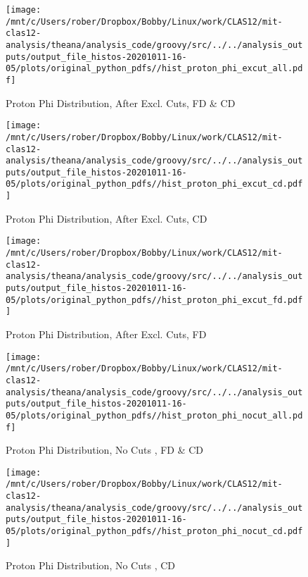 \documentclass{article}
\begin{document}
\begin{landscape}
    \begin{figure}[h]
        \centering

        \texttt{[image: /mnt/c/Users/rober/Dropbox/Bobby/Linux/work/CLAS12/mit-clas12-analysis/theana/analysis\_code/groovy/src/../../analysis\_outputs/output\_file\_histos-20201011-16-05/plots/original\_python\_pdfs//hist\_proton\_phi\_excut\_all.pdf]}
        \captionsetup{textformat=empty,labelformat=blank}
        \caption{Proton Phi Distribution, After Excl. Cuts, FD \& CD}
    \end{figure}
    \clearpage
    
    \begin{figure}[h]
        \centering

        \texttt{[image: /mnt/c/Users/rober/Dropbox/Bobby/Linux/work/CLAS12/mit-clas12-analysis/theana/analysis\_code/groovy/src/../../analysis\_outputs/output\_file\_histos-20201011-16-05/plots/original\_python\_pdfs//hist\_proton\_phi\_excut\_cd.pdf]}
        \captionsetup{textformat=empty,labelformat=blank}
        \caption{Proton Phi Distribution, After Excl. Cuts, CD}
    \end{figure}
    \clearpage
    
    \begin{figure}[h]
        \centering

        \texttt{[image: /mnt/c/Users/rober/Dropbox/Bobby/Linux/work/CLAS12/mit-clas12-analysis/theana/analysis\_code/groovy/src/../../analysis\_outputs/output\_file\_histos-20201011-16-05/plots/original\_python\_pdfs//hist\_proton\_phi\_excut\_fd.pdf]}
        \captionsetup{textformat=empty,labelformat=blank}
        \caption{Proton Phi Distribution, After Excl. Cuts, FD}
    \end{figure}
    \clearpage
    
    \begin{figure}[h]
        \centering

        \texttt{[image: /mnt/c/Users/rober/Dropbox/Bobby/Linux/work/CLAS12/mit-clas12-analysis/theana/analysis\_code/groovy/src/../../analysis\_outputs/output\_file\_histos-20201011-16-05/plots/original\_python\_pdfs//hist\_proton\_phi\_nocut\_all.pdf]}
        \captionsetup{textformat=empty,labelformat=blank}
        \caption{Proton Phi Distribution, No Cuts , FD \& CD}
    \end{figure}
    \clearpage
    
    \begin{figure}[h]
        \centering

        \texttt{[image: /mnt/c/Users/rober/Dropbox/Bobby/Linux/work/CLAS12/mit-clas12-analysis/theana/analysis\_code/groovy/src/../../analysis\_outputs/output\_file\_histos-20201011-16-05/plots/original\_python\_pdfs//hist\_proton\_phi\_nocut\_cd.pdf]}
        \captionsetup{textformat=empty,labelformat=blank}
        \caption{Proton Phi Distribution, No Cuts , CD}
    \end{figure}
    \clearpage
    

\end{landscape}
\end{document}

